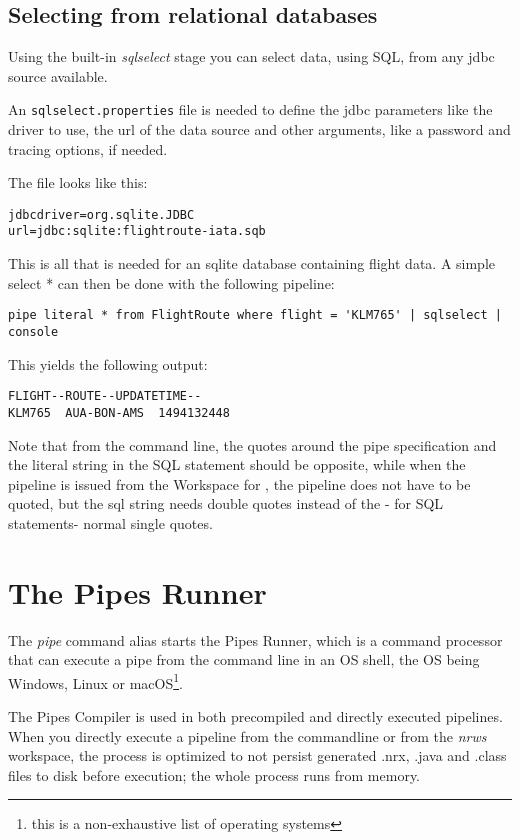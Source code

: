 \section{Selecting from relational databases}

Using the built-in \emph{sqlselect} stage you can select data, using
SQL, from any jdbc source available.

An \texttt{sqlselect.properties} file is needed to define the jdbc parameters
like the driver to use, the url of the data source and other
arguments, like a password and tracing options, if needed.

The file looks like this:
\begin{lstlisting}
jdbcdriver=org.sqlite.JDBC
url=jdbc:sqlite:flightroute-iata.sqb
\end{lstlisting}

This is all that is needed for an sqlite database containing flight
data. A simple select * can then be done with the following pipeline:

\begin{lstlisting}
pipe literal * from FlightRoute where flight = 'KLM765' | sqlselect | console
\end{lstlisting}

This yields the following output:
\begin{lstlisting}
FLIGHT--ROUTE--UPDATETIME--
KLM765  AUA-BON-AMS  1494132448
\end{lstlisting}

\begin{shaded}
Note that from the command line, the quotes around the pipe
specification and the literal string in the SQL statement should be
opposite, while when the pipeline is issued from the Workspace for
\nr{}, the pipeline does not have to be quoted, but the sql string
needs double quotes instead of the - for SQL statements- normal single quotes.
\end{shaded}
\chapter{The Pipes Runner}\label{pipesrunner}

The \emph{pipe} command alias starts the Pipes Runner, which is a
command processor that can execute a pipe from the command line in an
OS shell, the OS being Windows, Linux or macOS\footnote{this is a
  non-exhaustive list of operating systems}.

The Pipes Compiler is used in both precompiled and directly executed
pipelines. When you directly execute a pipeline from the commandline
or from the \emph{nrws} \nr{} workspace, the process is optimized to not persist
generated .nrx, .java and .class files to disk before execution; the
whole process runs from memory.

